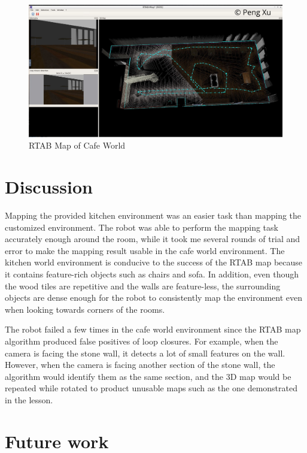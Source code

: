 \documentclass[10pt,journal,compsoc]{IEEEtran}
\begin{document}
\begin{figure}[thpb]
      \centering
      \includegraphics[width=\linewidth]{images/cafe-rtab-map.png}
      \caption{RTAB Map of Cafe World}
      \label{fig:cafe-rtab-map}
\end{figure}

\section{Discussion}

Mapping the provided kitchen environment was an easier task than mapping the customized environment. The robot was able to perform the mapping task accurately enough around the room, while it took me several rounds of trial and error to make the mapping result usable in the cafe world environment. The kitchen world environment is conducive to the success of the RTAB map because it contains feature-rich objects such as chairs and sofa. In addition, even though the wood tiles are repetitive and the walls are feature-less, the surrounding objects are dense enough for the robot to consistently map the environment even when looking towards corners of the rooms.

The robot failed a few times in the cafe world environment since the RTAB map algorithm produced false positives of loop closures. For example, when the camera is facing the stone wall, it detects a lot of small features on the wall. However, when the camera is facing another section of the stone wall, the algorithm would identify them as the same section, and the 3D map would be repeated while rotated to product unusable maps such as the one demonstrated in the lesson. 

\section{Future work}
\end{document}
